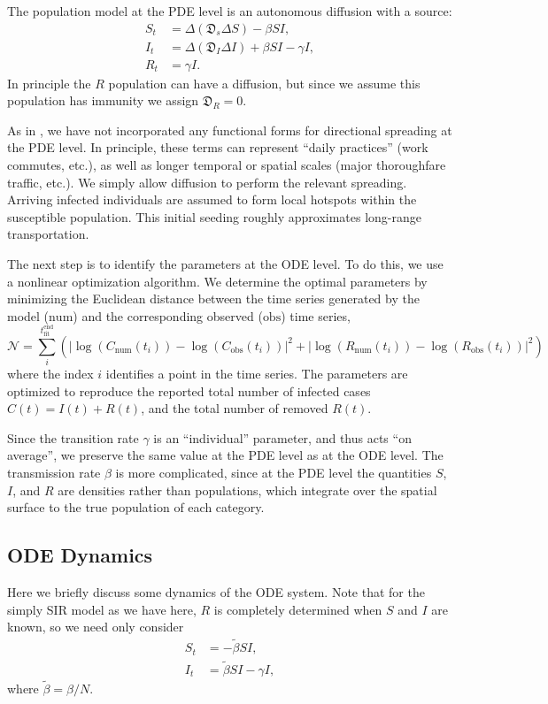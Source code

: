 \documentclass[11pt]{article}
\newcommand{\N}{\mathcal{N}}
\newcommand{\num}{\text{num}}
\newcommand{\obs}{\text{obs}}
\newcommand{\D}{\mathfrak{D}}
\begin{document}
The population model at the PDE level is an autonomous diffusion with a source:
\begin{align}
	S_t	&=	\Delta (\D_s \Delta S) - \beta SI,	\\
	I_t	&=	\Delta (\D_I \Delta I) + \beta SI - \gamma I,	\\
	R_t	&=	\gamma I.
\end{align}
In principle the $R$ population can have a diffusion, but since we assume this population has immunity we assign $\D_R = 0$.

As in \cite{Kevrekidis_2021}, we have not incorporated any functional forms for directional spreading at the PDE level.
In principle, these terms can represent ``daily practices'' (work commutes, etc.), as well as longer temporal or spatial scales (major thoroughfare traffic, etc.).
We simply allow diffusion to perform the relevant spreading.
Arriving infected individuals are assumed to form local hotspots within the susceptible population.
This initial seeding roughly approximates long-range transportation.

The next step is to identify the parameters at the ODE level.
To do this, we use a nonlinear optimization algorithm.
We determine the optimal parameters by minimizing the Euclidean distance between the time series generated by the model ($\num$) and the corresponding observed ($\obs$) time series,
\begin{equation} \label{eq:obj}
	\N = \sum_i^{t_\text{fit}^\text{end}} \left( \left| \log(C_\num (t_i)) - \log(C_\obs (t_i)) \right|^2 + \left| \log(R_\num (t_i)) - \log(R_\obs (t_i)) \right|^2 \right)
\end{equation}
where the index $i$ identifies a point in the time series.
The parameters are optimized to reproduce the reported total number of infected cases $C(t) = I(t) + R(t)$, and the total number of removed $R(t)$.

Since the transition rate $\gamma$ is an ``individual'' parameter, and thus acts ``on average'', we preserve the same value at the PDE level as at the ODE level.
The transmission rate $\beta$ is more complicated, since at the PDE level the quantities $S$, $I$, and $R$ are densities rather than populations,
which integrate over the spatial surface to the true population of each category.

\subsection{ODE Dynamics}
Here we briefly discuss some dynamics of the ODE system.
Note that for the simply SIR model as we have here, $R$ is completely determined when $S$ and $I$ are known, so we need only consider
\begin{align*}
	S_t	&=	- \tilde{\beta} SI, \\
	I_t	&=	\tilde{\beta} SI - \gamma I,
\end{align*}
where $\tilde{\beta} = \beta / N$.
\end{document}
